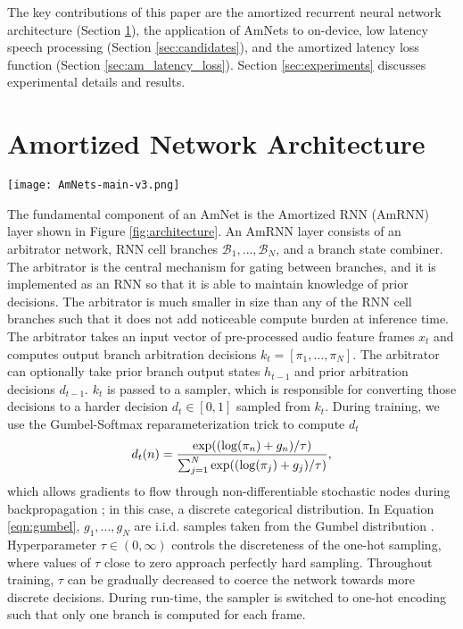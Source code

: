 \documentclass[a4paper]{article}
\begin{document}
The key contributions of this paper are the amortized recurrent neural network architecture (Section \ref{sec:amnet_architecture}), the application of AmNets to on-device, low latency speech processing (Section \ref{sec:candidates}), and the amortized latency loss function (Section \ref{sec:am_latency_loss}). Section \ref{sec:experiments} discusses experimental details and results.


\section{Amortized Network Architecture}
\label{sec:amnet_architecture}
\begin{figure*}[th!]
	\centering
\texttt{[image: AmNets-main-v3.png]}
\caption{\small Unfolded AmRNN layer with $N$ branches. Each block represents the execution of an AmRNN layer at a single time step, i.e., a single cell. Left and center blocks illustrate branch combining during training; right block shows run-time hard branch switching.}
\label{fig:architecture}
\end{figure*}

The fundamental component of an AmNet is the Amortized RNN (AmRNN) layer shown in Figure \ref{fig:architecture}.
An AmRNN layer consists of an arbitrator network, RNN cell branches $\mathcal{B}_1, \ldots, \mathcal{B}_N$, and a branch state combiner.
The arbitrator is the central mechanism for gating between branches, and it is implemented as an RNN so that it is able to maintain knowledge of prior decisions.
The arbitrator is much smaller in size than any of the RNN cell branches such that it does not add noticeable compute burden at inference time.
The arbitrator takes an input vector of pre-processed audio feature frames $x_{t}$ and computes output branch arbitration decisions $k_{t}=[\pi_{1}, \ldots, \pi_{N}]$.
The arbitrator can optionally take prior branch output states $h_{t-1}$ and prior arbitration decisions $d_{t-1}$.
$k_{t}$ is passed to a sampler, which is responsible for converting those decisions to a harder decision $d_{t} \in [0, 1]$ sampled from $k_{t}$.
During training, we use the Gumbel-Softmax reparameterization trick to compute $d_{t}$
\noindent
\begin{equation}\label{eqn:gumbel}
	\noindent
	d_{t}(n)=\frac{\textrm{exp}((\mathrm{log}(\pi_n)+g_n)/\tau)}{\sum_{j=1}^{N}\textrm{exp}((\mathrm{log}(\pi_j)+g_j)/\tau)},
\end{equation}
\noindent
which allows gradients to flow through non-differentiable stochastic nodes during backpropagation \cite{Jang2017}; in this case, a discrete categorical distribution. 
In Equation \ref{eqn:gumbel}, $g_1,...,g_N$ are i.i.d. samples taken from the Gumbel distribution \cite{Gumbel1960}.
Hyperparameter $\tau \in (0,\infty)$ controls the discreteness of the one-hot sampling, where values of $\tau$ close to zero approach perfectly hard sampling.
Throughout training, $\tau$ can be gradually decreased to coerce the network towards more discrete decisions.
During run-time, the sampler is switched to one-hot encoding such that only one branch is computed for each frame. 
\end{document}
